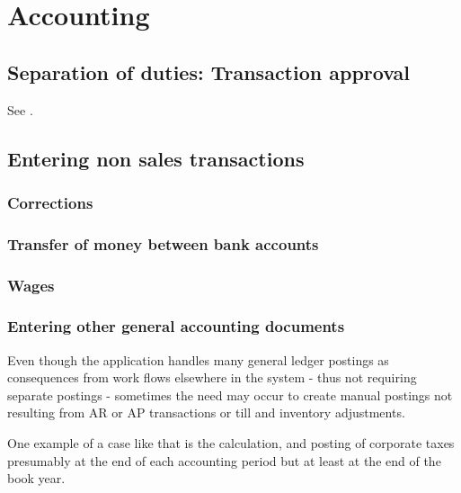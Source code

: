 \chapter{Accounting}
\label{cha-business-processes-accounting}

\section{Separation of duties: Transaction approval}
\label{sec-business-processes-accounting-transaction-approval}

See .

\section{Entering non sales transactions}
\label{sec-business-processes-accounting-transaction-entry}

\subsection{Corrections}
\label{subsec-business-processes-accounting-correction-transaction-entry}

\subsection{Transfer of money between bank accounts}
\label{subsec-business-processes-accounting-entry-bank-to-bank-transactions}

\subsection{Wages}
\label{subsec-business-processes-accounting-entry-of-wages}

\subsection{Entering other general accounting documents}
\label{subsec-business-processes-accounting-entry-others}

Even though the application handles many general ledger postings as consequences
from work flows elsewhere in the system - thus not requiring separate postings -
sometimes the need may occur to create manual postings not resulting from
AR or AP transactions or till and inventory adjustments.

One example of a case like that is the calculation, and posting of
corporate taxes presumably at the end of each accounting period but at least
at the end of the book year.


